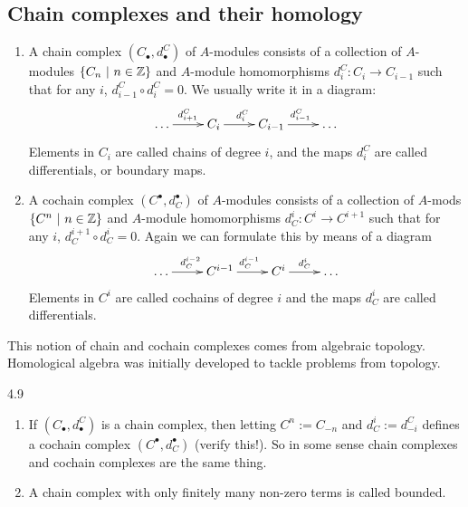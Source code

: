 \documentclass[twoside = false,	%
		headsepline,		%
		parskip = true,
		]{scrbook}						%
\begin{document}
    \subsection{Chain complexes and their homology}
        \begin{definition}{}{}
            \begin{enumerate}
                \item A chain complex $(C_\bullet, d^C_\bullet)$ of $A$-modules consists of a collection of $A$-modules $\{ C_n \ | \  n \in \mathbb Z \}$ and $A$-module homomorphisms $d_i^C: C_i \to C_{i-1}$ such that for any $i$, $d_{i-1}^C \circ d_i^C = 0$. We usually write it in a diagram:
                \begin{equation*}
                \xymatrix {
                    \dots \ar[r]^{d_{i+1}^C} & C_i \ar[r]^{d_{i}^C} & C_{i-1} \ar[r]^{d_{i-1}^C} & \dots
                }
                \end{equation*}
                Elements in $C_i$ are called chains of degree $i$, and the maps $d_i^C$ are called differentials, or boundary maps.
                \item A cochain complex $(C^\bullet,d^\bullet_C)$ of $A$-modules consists of a collection of $A$-mods $\{C^n \ | \ n \in \mathbb Z \}$ and $A$-module homomorphisms $d_C^i: C^i \to C^{i+1}$ such that for any $i$, $d_C^{i+1} \circ d_C^{i} = 0$. Again we can formulate this by means of a diagram
                \begin{equation*}
                \xymatrix {
                    \dots \ar[r]^{d^{i-2}_C} & C^{i-1} \ar[r]^{d^{i-1}_C} & C^i \ar[r]^{d^{i}_C} & \dots
                }
                \end{equation*}
                Elements in $C^i$ are called cochains of degree $i$ and the maps $d_C^i$ are called differentials.
            \end{enumerate}
        \end{definition}

        This notion of chain and cochain complexes comes from algebraic topology. Homological algebra was initially developed to tackle problems from topology.

        \begin{remark}{}{4.9}
            \begin{enumerate}
                \item If $(C_\bullet,d_\bullet^C)$ is a chain complex, then letting $C^n:=C_{-n}$ and $d_C^i:=d_{-i}^C$ defines a cochain complex $(C^\bullet,d^\bullet_C)$ (verify this!). So in some sense chain complexes and cochain complexes are the same thing.
                \item A chain complex with only finitely many non-zero terms is called bounded.
            \end{enumerate}
        \end{remark}
\end{document}
